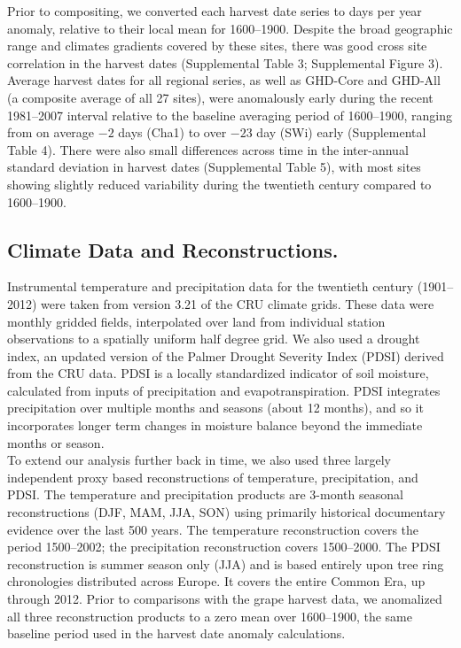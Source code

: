 \documentclass[final]{nature}
\begin{document}
\begin{methods}
\indent Prior to compositing, we converted each harvest date series to days per year anomaly, relative to their local mean for 1600--1900. Despite the broad geographic range and climates gradients covered by these sites, there was good cross site correlation in the harvest dates (Supplemental Table 3; Supplemental Figure 3). Average harvest dates for all regional series, as well as GHD-Core and GHD-All (a composite average of all 27 sites), were anomalously early during the recent 1981--2007 interval relative to the baseline averaging period of 1600--1900, ranging from on average $-2$ days (Cha1) to over $-23$ day (SWi) early (Supplemental Table 4). There were also small differences across time in the inter-annual standard deviation in harvest dates (Supplemental Table 5), with most sites showing slightly reduced variability during the twentieth century compared to 1600--1900.

\subsection{Climate Data and Reconstructions.}
\noindent Instrumental temperature and precipitation data for the twentieth century (1901--2012) were taken from version 3.21 of the CRU climate grids\cite{Harris2014}. These data were monthly gridded fields, interpolated over land from individual station observations to a spatially uniform half degree grid. We also used a drought index, an updated version of the Palmer Drought Severity Index (PDSI\cite{Palmer:1965}) derived from the CRU data\cite{Schrier2013}. PDSI is a locally standardized indicator of soil moisture, calculated from inputs of precipitation and evapotranspiration. PDSI integrates precipitation over multiple months and seasons (about 12 months), and so it incorporates longer term changes in moisture balance beyond the immediate months or season.\\
\indent To extend our analysis further back in time, we also used three largely independent proxy based reconstructions of temperature\cite{Luterbacher2004}, precipitation\cite{Pauling2006}, and PDSI\cite{CookOWDA2015}. The temperature and precipitation products are 3-month seasonal reconstructions (DJF, MAM, JJA, SON) using primarily historical documentary evidence over the last 500 years. The temperature reconstruction covers the period 1500--2002; the precipitation reconstruction covers 1500--2000. The PDSI reconstruction is summer season only (JJA) and is based entirely upon tree ring chronologies distributed across Europe. It covers the entire Common Era, up through 2012. Prior to comparisons with the grape harvest data, we anomalized all three reconstruction products to a zero mean over 1600--1900, the same baseline period used in the harvest date anomaly calculations.


\end{methods}
\end{document}
